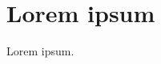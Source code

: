 \documentclass[main.tex]{subfiles}
\begin{document}
\section{Lorem ipsum}

Lorem ipsum.
\end{document}

